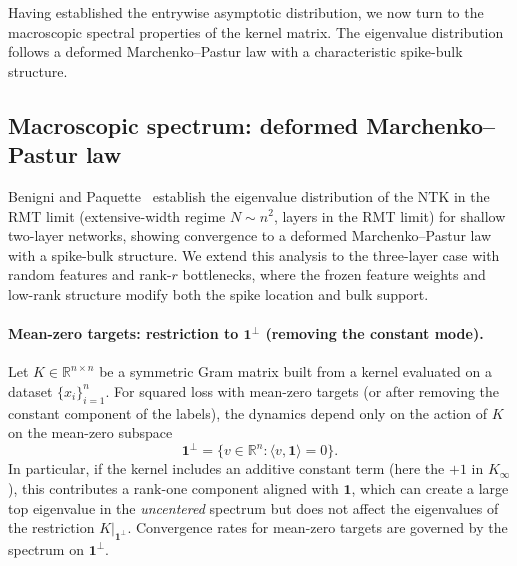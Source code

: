 Having established the entrywise asymptotic distribution, we now turn to the macroscopic spectral properties of the kernel matrix. The eigenvalue distribution follows a deformed Marchenko–Pastur law with a characteristic spike-bulk structure.

\subsection{Macroscopic spectrum: deformed Marchenko–Pastur law}
Benigni and Paquette~\cite{benigni2025eigenvaluedistributionneuraltangent} establish the eigenvalue distribution of the NTK in the RMT limit (extensive-width regime \(N\sim n^2\), layers in the RMT limit) for shallow two-layer networks, showing convergence to a deformed Marchenko--Pastur law with a spike-bulk structure. We extend this analysis to the three-layer case with random features and rank-\( r \) bottlenecks, where the frozen feature weights and low-rank structure modify both the spike location and bulk support.

\paragraph{Mean-zero targets: restriction to \texorpdfstring{\(\mathbf{1}^\perp\)}{1-perp} (removing the constant mode).}
Let \(K\in\mathbb{R}^{n\times n}\) be a symmetric Gram matrix built from a kernel evaluated on a dataset \(\{x_i\}_{i=1}^n\). For squared loss with mean-zero targets (or after removing the constant component of the labels), the dynamics depend only on the action of \(K\) on the mean-zero subspace
\[
\mathbf{1}^\perp=\{v\in\mathbb{R}^n:\langle v,\mathbf{1}\rangle=0\}.
\]
In particular, if the kernel includes an additive constant term (here the \(+1\) in \(K_\infty\)), this contributes a rank-one component aligned with \(\mathbf{1}\), which can create a large top eigenvalue in the \emph{uncentered} spectrum but does not affect the eigenvalues of the restriction \(K|_{\mathbf{1}^\perp}\). Convergence rates for mean-zero targets are governed by the spectrum on \(\mathbf{1}^\perp\).

